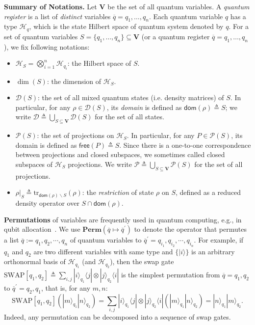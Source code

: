 \documentclass[conference,compsoc, 10pt]{IEEEtran}
\newcommand {\qbar} {{\overline{q}}}
\newcommand {\cD } {{\mathcal{D}}}
\newcommand {\cP } {{\mathcal{P}}}
\newcommand {\cH } {{\mathcal{H}}}
\newcommand {\dom }[1] {{\mathsf{dom}\!\left(#1\right)}}
\newcommand {\free }[1] {{\mathsf{free}\left(#1\right)}}
\newcommand {\rt }[2] {{\left.{#1}\right|_{#2}}}
\newcommand {\tr } {{\mathrm{tr}}}
\newcommand {\vars } {\mathbf{V}}
\def\>{\ensuremath{\rangle}}
\def\<{\ensuremath{\langle}}
\newcommand {\swap} {\mathrm{SWAP}}
\newcommand {\perm} {\mathbf{Perm}}
\begin{document}
\begin{appendices}
		\vspace{0.2cm}
		\noindent\textbf{Summary of Notations.}
		Let $\vars$ be  the set of all quantum variables. A \emph{quantum register} is a list of \emph{distinct} variables $\qbar = q_1,\dots,q_n$. Each quantum variable $q$ has a type $\cH_q$, which is the state Hilbert space of quantum system denoted by $q$.
		For a set of quantum variables $S = \{q_1,\dots,q_n\}\subseteq \vars$ (or a quantum register $\qbar = q_1,\dots,q_n$), we fix following notations:
		\begin{itemize}
			\item $\cH_S = \bigotimes_{i=1}^n\cH_{q_i}$: the Hilbert space of $S$.
			\item $\dim(S)$: the dimension of $\cH_S$.
			\item $\cD(S)$: the set of all mixed quantum states (i.e. density matrices)
			of $S$. In particular, for any $\rho\in\cD(S)$, its \emph{domain} is
			defined as $\dom{\rho}\triangleq S$; we write $\cD \triangleq
			\bigcup_{S\subseteq \vars}\cD(S)$ for the set of all states.
			\item $\cP(S)$: the set of projections on $\cH_S$. In particular, for any
			$P\in\cP(S)$, its domain is defined as $\free{P} \triangleq S$.  Since
			there is a one-to-one correspondence between projections and closed
			subspaces, we sometimes called closed subspaces of $\cH_S$ projections.
			We write $\cP\triangleq \bigcup_{S\subseteq \vars}\cP(S)$ for the set of
			all projections.
			\item $
			\rt{\rho}{S} \triangleq 
			\tr_{\dom{\rho}\backslash S}(\rho)
			$: the \emph{restriction} of state $\rho$ on $S$,  defined as a reduced density operator over $S\cap\dom{\rho}$. 
		\end{itemize}
		
		
		\vspace{0.3cm}
		
		\noindent\textbf{Permutations} of variables are frequently used in quantum computing, e.g., in qubit allocation~\cite{SSV18}. We use 
		$\perm(\qbar\mapsto\qbar^\prime)$ to denote the operator  
		that permutes a list $\qbar := q_1,q_2,\cdots,q_n$ of quantum variables to $\qbar^\prime = q_{i_1},q_{i_2},\cdots,q_{i_n}$. 	For example, if $q_1$ and $q_2$ are two different variables with same type and $\{|i\>\}$ is an arbitrary orthonormal basis of $\cH_{q_1}$ (and $\cH_{q_2}$), then the swap gate 
		$\swap[q_1,q_2]\triangleq\sum_{i,j}|i\>_{q_1}\<j|\otimes|j\>_{q_2}\<i|$ is the simplest permutation from $\qbar=q_1, q_2$ to $\qbar^\prime=q_2,q_1$, that is, for any $m,n$:
		$$\swap[q_1,q_2](|m\>_{q_1}|n\>_{q_2}) = \sum_{i,j}|i\>_{q_1}\<j|\otimes|j\>_{q_2}\<i|(|m\>_{q_1}|n\>_{q_2}) =   |n\>_{q_1}|m\>_{q_2}.$$
		Indeed, any permutation can be decomposed into a sequence of swap gates.
		

\end{appendices}
\end{document}
